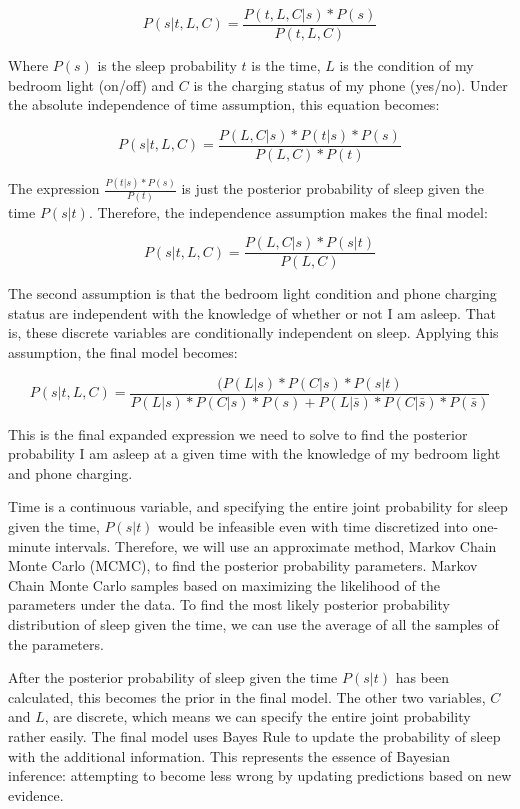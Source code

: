 \documentclass[12pt]{article}
\begin{document}
\[P(s|t, L, C) = \frac{P(t, L, C|s) * P (s)}{P(t, L, C)}\]

Where \(P(s)\) is the sleep probability \(t\) is the time, \(L\) is the
condition of my bedroom light (on/off) and \(C\) is the charging status
of my phone (yes/no). Under the absolute independence of time
assumption, this equation becomes:

\[P(s|t, L, C) = \frac{P(L, C|s) * P(t|s) * P(s)}{P(L, C) * P(t)}\]

The expression \(\frac{P(t|s) * P(s)}{P(t)}\) is just the posterior
probability of sleep given the time \(P(s|t)\). Therefore, the
independence assumption makes the final model:

\[P(s|t, L, C) = \frac{P(L, C|s) * P(s|t)}{P(L, C)}\]

The second assumption is that the bedroom light condition and phone
charging status are independent with the knowledge of whether or not I
am asleep. That is, these discrete variables are conditionally
independent on sleep. Applying this assumption, the final model becomes:

\[P(s | t, L, C) = \frac{(P(L|s) * P(C|s) * P(s|t)}{P(L|s) * P(C|s) * P(s) + P(L|\bar{s}) * P(C|\bar{s}) * P(\bar{s})}\]

This is the final expanded expression we need to solve to find the
posterior probability I am asleep at a given time with the knowledge of
my bedroom light and phone charging.

Time is a continuous variable, and specifying the entire joint
probability for sleep given the time, \(P(s|t)\) would be infeasible
even with time discretized into one-minute intervals. Therefore, we will
use an approximate method, Markov Chain Monte Carlo (MCMC), to find the
posterior probability parameters. Markov Chain Monte Carlo samples based
on maximizing the likelihood of the parameters under the data. To find
the most likely posterior probability distribution of sleep given the
time, we can use the average of all the samples of the parameters.

After the posterior probability of sleep given the time \(P(s|t)\) has
been calculated, this becomes the prior in the final model. The other
two variables, \(C\) and \(L\), are discrete, which means we can specify
the entire joint probability rather easily. The final model uses Bayes
Rule to update the probability of sleep with the additional information.
This represents the essence of Bayesian inference: attempting to become
less wrong by updating predictions based on new evidence.
\end{document}
